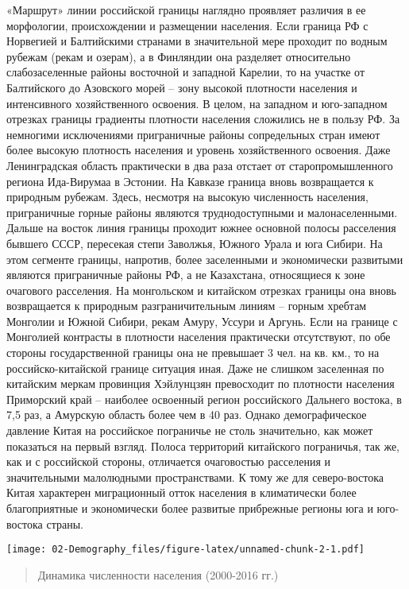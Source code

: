 \documentclass[]{book}
\begin{document}
«Маршрут» линии российской границы наглядно проявляет различия в ее
морфологии, происхождении и размещении населения. Если граница РФ с
Норвегией и Балтийскими странами в значительной мере проходит по водным
рубежам (рекам и озерам), а в Финляндии она разделяет относительно
слабозаселенные районы восточной и западной Карелии, то на участке от
Балтийского до Азовского морей -- зону высокой плотности населения и
интенсивного хозяйственного освоения. В целом, на западном и
юго-западном отрезках границы градиенты плотности населения сложились не
в пользу РФ. За немногими исключениями приграничные районы сопредельных
стран имеют более высокую плотность населения и уровень хозяйственного
освоения. Даже Ленинградская область практически в два раза отстает от
старопромышленного региона Ида-Вирумаа в Эстонии. На Кавказе граница
вновь возвращается к природным рубежам. Здесь, несмотря на высокую
численность населения, приграничные горные районы являются
труднодоступными и малонаселенными. Дальше на восток линия границы
проходит южнее основной полосы расселения бывшего СССР, пересекая степи
Заволжья, Южного Урала и юга Сибири. На этом сегменте границы, напротив,
более заселенными и экономически развитыми являются приграничные районы
РФ, а не Казахстана, относящиеся к зоне очагового расселения. На
монгольском и китайском отрезках границы она вновь возвращается к
природным разграничительным линиям -- горным хребтам Монголии и Южной
Сибири, рекам Амуру, Уссури и Аргунь. Если на границе с Монголией
контрасты в плотности населения практически отсутствуют, по обе стороны
государственной границы она не превышает 3 чел. на кв. км., то на
российско-китайской границе ситуация иная. Даже не слишком заселенная по
китайским меркам провинция Хэйлунцзян превосходит по плотности населения
Приморский край -- наиболее освоенный регион российского Дальнего
востока, в 7,5 раз, а Амурскую область более чем в 40 раз. Однако
демографическое давление Китая на российское пограничье не столь
значительно, как может показаться на первый взгляд. Полоса территорий
китайского пограничья, так же, как и с российской стороны, отличается
очаговостью расселения и значительными малолюдными пространствами. К
тому же для северо-востока Китая характерен миграционный отток населения
в климатически более благоприятные и экономически более развитые
прибрежные регионы юга и юго-востока страны.

\texttt{[image: 02-Demography\_files/figure-latex/unnamed-chunk-2-1.pdf]}

\begin{quote}
Динамика численности населения (2000-2016 гг.)
\end{quote}
\end{document}
